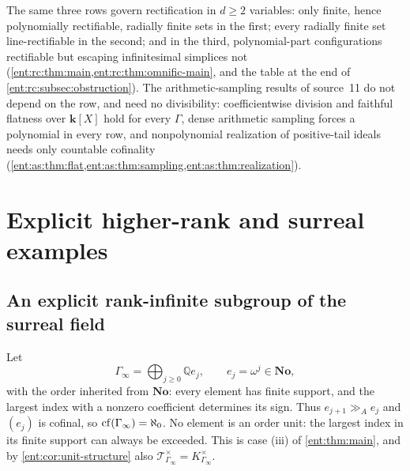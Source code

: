 \documentclass[11pt]{article}
\theoremstyle{plain}
\theoremstyle{plain}
\theoremstyle{plain}
\theoremstyle{definition}
\theoremstyle{definition}
\theoremstyle{definition}
\theoremstyle{definition}
\theoremstyle{remark}
\newcommand{\Q}{\mathbb Q}\newcommand{\Z}{\mathbb Z}\newcommand{\N}{\mathbb N}
\newcommand{\No}{\mathbf{No}}
\newcommand{\ggA}{\mathrel{\gg_{\!A}}}
\newcommand{\kk}{\mathbf k}\newcommand{\PP}{\mathbb P}
\begin{document}
The same three rows govern rectification in $d\ge2$ variables: only finite,
hence polynomially rectifiable, radially finite sets in the first; every
radially finite set line-rectifiable in the second; and in the third,
polynomial-part configurations rectifiable but escaping infinitesimal
simplices not (\cref{ent:rc:thm:main,ent:rc:thm:omnific-main}, and the table
at the end of \cref{ent:rc:subsec:obstruction}).
The arithmetic-sampling results of source~11 do not depend on the row, and
need no divisibility: coefficientwise division and faithful flatness over
$\kk[X]$ hold for every $\Gamma$, dense arithmetic sampling forces a polynomial
in every row, and nonpolynomial realization of positive-tail ideals needs only
countable cofinality
(\cref{ent:as:thm:flat,ent:as:thm:sampling,ent:as:thm:realization}).

\section{Explicit higher-rank and surreal examples}
\label{ent:sec:examples}

\subsection{An explicit rank-infinite subgroup of the surreal field}
\label{ent:subsec:gamma-infinity}
Let
\begin{equation}\label{ent:eq:concrete-group}
 \Gamma_\infty=\bigoplus_{j\ge0}\Q e_j,
 \qquad e_j=\omega^j\in\No,
\end{equation}
with the order inherited from $\No$: every element has finite support, and
the largest index with a nonzero coefficient determines its sign. Thus
$e_{j+1}\ggA e_j$ and $(e_j)$ is cofinal, so $\operatorname{cf}(\Gamma_\infty)=\aleph_0$.
No element is an order unit: the largest index in its finite support can
always be exceeded. This is case (iii) of \cref{ent:thm:main}, and by
\cref{ent:cor:unit-structure} also
$\mathcal T_{\Gamma_\infty}^\times=K_{\Gamma_\infty}^\times$.
\end{document}
